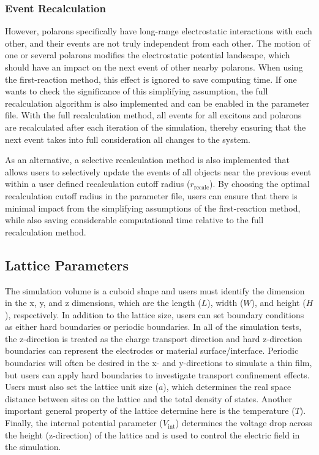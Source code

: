 \documentclass[%
 reprint,onecolumn,notitlepage,
superscriptaddress,longbibliography,
 amsmath,amssymb,
 aps,rmp,floatfix,
]{revtex4-1}
\begin{document}
\subsubsection{Event Recalculation}

However, polarons specifically have long-range electrostatic interactions with each other, and their events are not truly independent from each other.
The motion of one or several polarons modifies the electrostatic potential landscape, which should have an impact on the next event of other nearby polarons. 
When using the first-reaction method, this effect is ignored to save computing time. 
If one wants to check the significance of this simplifying assumption, the full recalculation algorithm is also implemented and can be enabled in the parameter file. 
With the full recalculation method, all events for all excitons and polarons are recalculated after each iteration of the simulation, thereby ensuring that the next event takes into full consideration all changes to the system.

As an alternative, a selective recalculation method is also implemented that allows users to selectively update the events of all objects near the previous event within a user defined recalculation cutoff radius ($r_\text{recalc}$).\cite{heiber2012jcp} 
By choosing the optimal recalculation cutoff radius in the parameter file, users can ensure that there is minimal impact from the simplifying assumptions of the first-reaction method, while also saving considerable computational time relative to the full recalculation method.

\subsection{Lattice Parameters}

The simulation volume is a cuboid shape and users must identify the dimension in the x, y, and z dimensions, which are the length ($L$), width ($W$), and height ($H$), respectively.
In addition to the lattice size, users can set boundary conditions as either hard boundaries or periodic boundaries. 
In all of the simulation tests, the z-direction is treated as the charge transport direction and hard z-direction boundaries can represent the electrodes or material surface/interface. 
Periodic boundaries will often be desired in the x- and y-directions to simulate a thin film, but users can apply hard boundaries to investigate transport confinement effects.
Users must also set the lattice unit size ($a$), which determines the real space distance between sites on the lattice and the total density of states.
Another important general property of the lattice determine here is the temperature ($T$).
Finally, the internal potential parameter ($V_\text{int}$) determines the voltage drop across the height (z-direction) of the lattice and is used to control the electric field in the simulation. 
\end{document}
